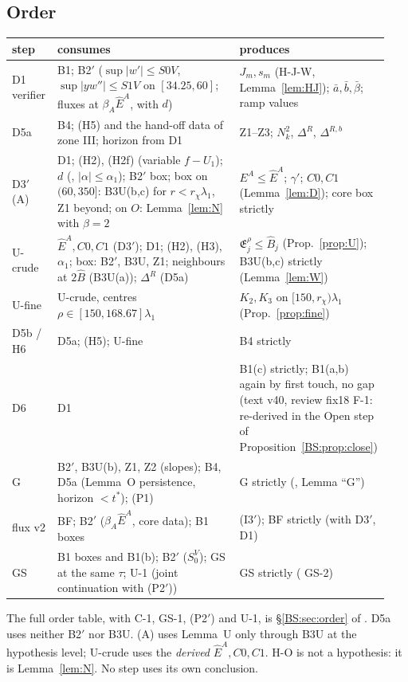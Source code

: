 \documentclass[11pt]{article}
\theoremstyle{definition}\newtheorem{definition}[theorem]{Definition}
\theoremstyle{remark}\newtheorem{remark}[theorem]{Remark}
\newcommand{\fn}[1]{\texttt{\detokenize{#1}}}
\newcommand{\E}{\mathfrak E}\newcommand{\B}{\mathfrak B}\newcommand{\Bh}{\hat B}\newcommand{\Eh}{\hat E^A}
\begin{document}
\subsection{Order}
\begin{center}\small\begin{tabular}{@{}p{0.12\linewidth}p{0.48\linewidth}p{0.34\linewidth}@{}}\toprule
step & consumes & produces\\\midrule
D1 verifier & B1; B2$'$ ($\sup|w'|\le S0V$, $\sup|yw''|\le S1V$ on $[34.25,60]$; fluxes at $\beta_A\Eh$, with $d$) & $J_m,s_m$ (H-J-W, Lemma~\ref{lem:HJ}); $\bar a,\bar b,\bar\beta$; ramp values\\
D5a & B4; (H5) and the hand-off data of zone III; horizon from D1 & Z1--Z3; $N_k^2$, $\Delta^R$, $\Delta^{R,b}$\\
D3$'$ (A) & D1; (H2), (H2f) (variable $f-U_1$); $d$ (\fn{b0_dprof}, $|\alpha|\le\alpha_1$); B2$'$ box; box on $(60,350]$: B3U(b,c) for $r<r_\chi\lambda_1$, Z1 beyond; on $O$: Lemma~\ref{lem:N} with $\beta=2$ & $E^A\le\Eh$; $\gamma'$; $C0,C1$ (Lemma~\ref{lem:D}); core box strictly\\
U-crude & $\Eh,C0,C1$ (D3$'$); D1; (H2), (H3), $\alpha_1$; box: B2$'$, B3U, Z1; neighbours at $2\Bh$ (B3U(a)); $\Delta^R$ (D5a) & $\E^\rho_j\le\Bh_j$ (Prop.~\ref{prop:U}); B3U(b,c) strictly (Lemma~\ref{lem:W})\\
U-fine & U-crude, centres $\rho\in[150,168.67]\lambda_1$ & $K_2,K_3$ on $[150,r_\chi)\lambda_1$ (Prop.~\ref{prop:fine})\\
D5b / H6 & D5a; (H5); U-fine & B4 strictly\\
D6 & D1 & B1(c) strictly; B1(a,b) again by first touch, no gap (text v40, review fix18 F-1: re-derived in the Open step of Proposition~\ref{BS:prop:close})\\
G & B2$'$, B3U(b), Z1, Z2 (slopes); B4, D5a (Lemma~O persistence, horizon $<t^*$); (P1) & G strictly (\fn{continuation_v44.tex}, Lemma ``G'')\\
flux v2 & BF; B2$'$ ($\beta_A\Eh$, core data); B1 boxes & (I3$'$); BF strictly (with D3$'$, D1)\\
GS & B1 boxes and B1(b); B2$'$ ($S^V_0$); GS at the same $\tau$; U-1 (joint continuation with (P2$'$)) & GS strictly (\fn{GS_lemma_v44.tex} GS-2)\\\bottomrule\end{tabular}\end{center}
\noindent The full order table, with C-1, GS-1, (P2$'$) and U-1, is \S\ref{BS:sec:order} of \fn{bootstrap_v44.tex}.
D5a uses neither B2$'$ nor B3U. (A) uses Lemma~U only through B3U at the hypothesis level; U-crude uses the \emph{derived} $\Eh,C0,C1$. H-O is not a hypothesis: it is Lemma~\ref{lem:N}. No step uses its own conclusion.
\end{document}
